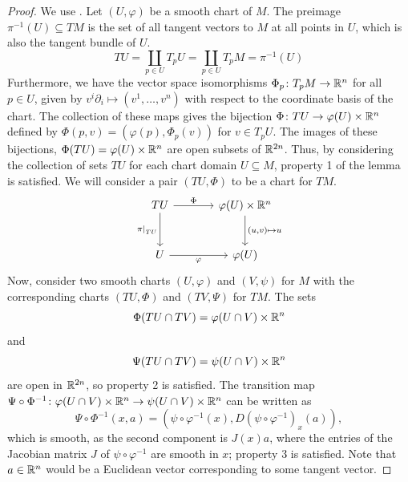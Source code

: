 \documentclass[a4paper,12pt]{article}
\begin{document}
\begin{proof}
    We use .
    Let $(U, \varphi)$ be a smooth chart of $M$.
    The preimage $\pi^{-1}(U) \subseteq TM$ is the set of all tangent vectors to $M$ at all points in $U$, which is also the tangent bundle of $U$.
    \begin{equation}
        TU = \coprod_{p \in U} T_p U = \coprod_{p \in U} T_p M = \pi^{-1} (U)
    \end{equation}
    Furthermore, we have the vector space isomorphisms $\Phi_p \colon T_p M \to \mathbb{R}^n$ for all $p \in U$, given by $v^i \partial_i \mapsto (v^1, \ldots, v^n)$ with respect to the coordinate basis of the chart.
    The collection of these maps gives the bijection $\Phi \colon TU \to \varphi(U) \times \mathbb{R}^n$ defined by $\Phi(p, v) = (\varphi(p), \Phi_p(v))$ for $v \in T_p U$.
    The images of these bijections, $\Phi(TU) = \varphi(U) \times \mathbb{R}^n$ are open subsets of $\mathbb{R}^{2n}$.
    Thus, by considering the collection of sets $TU$ for each chart domain $U \subseteq M$, property 1 of the lemma is satisfied.
    We will consider a pair $(TU, \Phi)$ to be a chart for $TM$.
    \[\begin{tikzcd}[sep=large]
        TU & {\varphi(U) \times \R^n} \\
        U & {\varphi(U)}
        \arrow["{\Phi}", from=1-1, to=1-2]
        \arrow["\eval{\pi}{TU}"', from=1-1, to=2-1]
        \arrow["{(u, v) \mapsto u}", from=1-2, to=2-2]
        \arrow["\varphi"', from=2-1, to=2-2]
    \end{tikzcd}\]
    Now, consider two smooth charts $(U, \varphi)$ and $(V, \psi)$ for $M$ with the corresponding charts $(TU, \Phi)$ and $(TV, \Psi)$ for $TM$.
    The sets
    \begin{equation*}
     \Phi(TU \cap TV) = \varphi(U \cap V) \times \mathbb{R}^n
    \end{equation*}
    and
    \begin{equation*}
    \Psi(TU \cap TV) = \psi(U \cap V) \times \mathbb{R}^n
    \end{equation*}
    are open in $\mathbb{R}^{2n}$, so property 2 is satisfied.
    The transition map $\Psi \circ \Phi^{-1} \colon \varphi(U \cap V) \times \mathbb{R}^n \to \psi(U \cap V) \times \mathbb{R}^n$ can be written as
    \begin{equation}
        \Psi \circ \Phi^{-1}(x, a) = (\psi \circ \varphi^{-1}(x), D(\psi \circ \varphi^{-1})_x(a)),
    \end{equation}
    which is smooth, as the second component is $J(x)a$, where the entries of the Jacobian matrix $J$ of $\psi \circ \varphi^{-1}$ are smooth in $x$; property 3 is satisfied.
    Note that $a \in \mathbb{R}^n$ would be a Euclidean vector corresponding to some tangent vector.


\end{proof}
\end{document}
